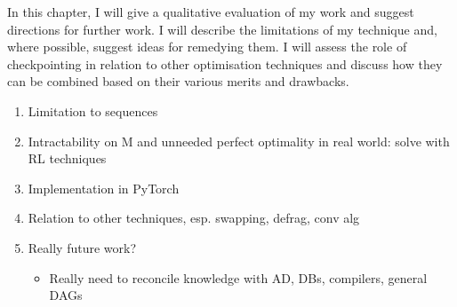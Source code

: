 In this chapter, I will give a qualitative evaluation of my work and suggest directions for further work.
I will describe the limitations of my technique and, where possible, suggest ideas for remedying them.
I will assess the role of checkpointing in relation to other optimisation techniques and discuss how they can be combined based on their various merits and drawbacks.
\begin{enumerate}[topsep=0.2em]
    \item Limitation to sequences
    \item Intractability on M and unneeded perfect optimality in real world: solve with RL techniques
    \item Implementation in PyTorch
    \item Relation to other techniques, esp. swapping, defrag, conv alg 
    \item Really future work?
    \begin{itemize}
        \item Really need to reconcile knowledge with AD, DBs, compilers, general DAGs
    \end{itemize}
\end{enumerate}